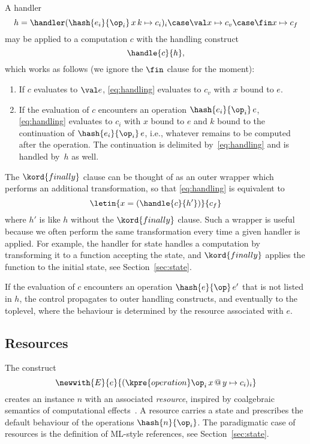 A handler
%
\begin{equation*}
 h =
 \handler
 (\hash{e_i}{\op_i} \, x \, k \mapsto c_i)_i \case \val x \mapsto c_v \case \fin x \mapsto c_f
\end{equation*}
%
may be applied to a computation $c$ with the handling construct
%
\begin{equation}
  \label{eq:handling}
   \handle{c}{h},
\end{equation}
%
which works as follows (we ignore the $\fin$ clause for the moment):
%
\begin{enumerate}
\item If $c$ evaluates to $\val e$, \eqref{eq:handling} evaluates to $c_v$ with $x$ bound to $e$.
\item If the evaluation of $c$ encounters an operation $\hash{e_i}{\op_i} \, e$,
  \eqref{eq:handling} evaluates to $c_i$ with $x$ bound to $e$ and $k$ bound to the
  continuation of $\hash{e_i}{\op_i} \, e$, i.e., whatever remains to be computed after the
  operation. The continuation is delimited by~\eqref{eq:handling} and is handled by~$h$ as
  well.
\end{enumerate}
%
The $\kord{finally}$ clause can be thought of as an outer wrapper which performs an
additional transformation, so that \eqref{eq:handling} is equivalent to
%
\begin{equation*}
  \letin{x = (\handle{c}{h'})}{c_f}  
\end{equation*}
%
where $h'$ is like $h$ without the $\kord{finally}$ clause. Such a wrapper is useful
because we often perform the same transformation every time a given handler is applied.
For example, the handler for state handles a computation by transforming it to a function
accepting the state, and $\kord{finally}$ applies the function to the initial state, see
Section~\ref{sec:state}.

If the evaluation of $c$ encounters an operation $\hash{e}{\op} \, e'$ that is not listed
in $h$, the control propagates to outer handling constructs, and eventually to the
toplevel, where the behaviour is determined by the resource associated with $e$.

\subsection{Resources}
\label{sec:resources}

The construct
%
\begin{equation*}
  \newwith{E}{e}{(\kpre{operation} \op_i \, x \, @ \, y \mapsto c_i)_i}
\end{equation*}
%
creates an instance $n$ with an associated \emph{resource}, inspired by coalgebraic
semantics of computational
effects~\cite{power04from,plotkin08:_tensor_comod_model_operat_seman}. A resource carries
a state and prescribes the default behaviour of the operations $\hash{n}{\op_i}$.
%
The paradigmatic case of resources is the definition of ML-style references, see Section~\ref{sec:state}.

